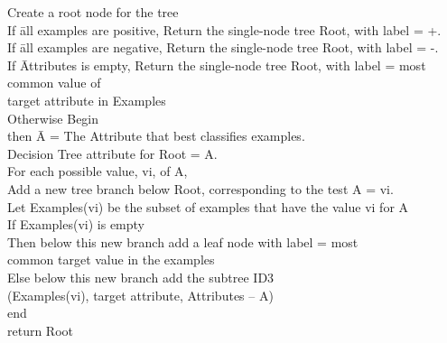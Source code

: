 \documentclass{report}
\begin{document}
\begin{tabbing}
Create a root node for the tree\\
If \= all examples are positive, Return the single-node tree Root, with label = +.\\
If \= all examples are negative, Return the single-node tree Root, with label = -.\\
If \= Attributes is empty, Return the single-node tree Root, with label = most common value of\\ target attribute in Examples\\
Otherwise Begin \\
\> then \=  A = The Attribute that best classifies examples.\\
\> Decision Tree attribute for Root = A.\\
\> For each possible value, vi, of A,\\
\> \> Add a new tree branch below Root, corresponding to the test A = vi.\\
\> \> Let Examples(vi) be the subset of examples that have the value vi for A\\
\> \> If Examples(vi) is empty\\
\> \> Then below this new branch add a leaf node with label = most\\
\> \> common target value in the examples\\
\> \> Else below this new branch add the subtree ID3 \\
\> \> (Examples(vi), target attribute, Attributes – {A})\\

end\\
return Root\\
\end{tabbing}
\end{document}
